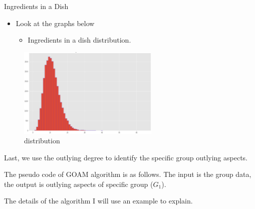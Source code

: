 \documentclass[
 size=14pt,
 paper=smartboard,  %
 mode=present, 		%
 display=slides, 	%
 style=tuliplab,  	%
 pauseslide,
 fleqn,leqno]{powerdot}
\begin{document}
\begin{slide}{Ingredients in a Dish}
  \begin{itemize}
    \item
    Look at the graphs below 
    \begin{itemize}
      \item
      Ingredients in a dish distribution.
      
     
      \end{itemize}
    \end{itemize}
    
    \begin{figure}
      \centering
      \includegraphics[width=0.6\textwidth,natwidth=866,natheight=550]{figures/cu.eps}
      \caption{distribution}\label{Checking for outliers}
    \end{figure}
    
    \begin{note}
    Last,
    we use the outlying degree to identify the specific group outlying aspects.
    
    The pseudo code of GOAM algorithm is as follows.
    The input is the group data,
    the output is outlying aspects of specific group ($G_1$).
    
    The details of the algorithm I will use an example to explain.
    \end{note}

\end{slide}
\end{document}
